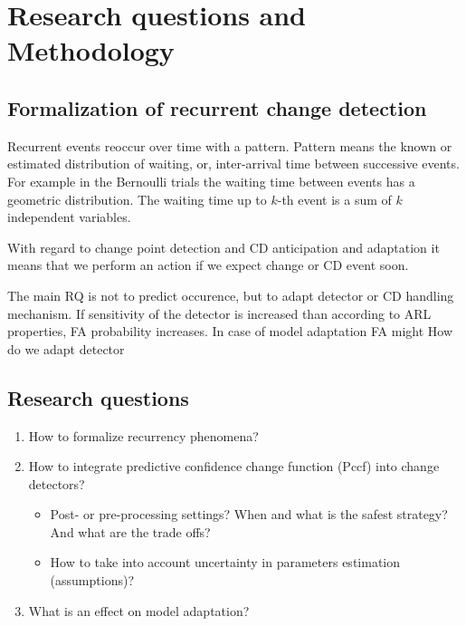 \chapter{Research questions and Methodology}

\section{Formalization of recurrent change detection}
Recurrent events reoccur over time with a pattern.
Pattern means the known or estimated distribution of waiting, or, inter-arrival time between successive events.
For example in the Bernoulli trials the waiting time between events has a geometric distribution.
The waiting time up to $k$-th event is a sum of $k$ independent variables.

With regard to change point detection and CD anticipation and adaptation it means that we perform an action if we expect change or CD event soon.

The main RQ is not to predict occurence, but to adapt detector or CD handling mechanism.
If sensitivity of the detector is increased than according to ARL properties, FA probability increases.
In case of model adaptation FA might
How do we adapt detector 



\section{Research questions}

\begin{enumerate}
  \item How to formalize recurrency phenomena?
  \item How to integrate predictive confidence change function (Pccf) into change detectors?
  \begin{itemize}
    \item Post- or pre-processing settings? When and what is the safest strategy? And what are the trade offs?
    \item How to take into account uncertainty in parameters estimation (assumptions)?
  \end{itemize}
  \item What is an effect on model adaptation?
\end{enumerate}

